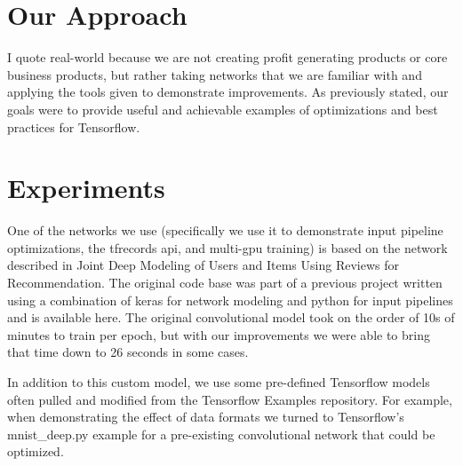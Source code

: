 \documentclass{article}
\begin{document}
\section{Our Approach}
I quote real-world because we are not creating profit generating products or core business products, but rather taking networks that we are familiar with and applying the tools given to demonstrate improvements. As previously stated, our goals were to provide useful and achievable examples of optimizations and best practices for Tensorflow.

\section{Experiments}
One of the networks we use (specifically we use it to demonstrate input pipeline optimizations, the tfrecords api, and multi-gpu training) is based on the network described in Joint Deep Modeling of Users and Items Using Reviews for Recommendation. The original code base was part of a previous project written using a combination of keras for network modeling and python for input pipelines and is available here. The original convolutional model took on the order of 10s of minutes to train per epoch, but with our improvements we were able to bring that time down to 26 seconds in some cases.

In addition to this custom model, we use some pre-defined Tensorflow models often pulled and modified from the Tensorflow Examples repository. For example, when demonstrating the effect of data formats we turned to Tensorflow's mnist_deep.py example for a pre-existing convolutional network that could be optimized.



\end{document}
